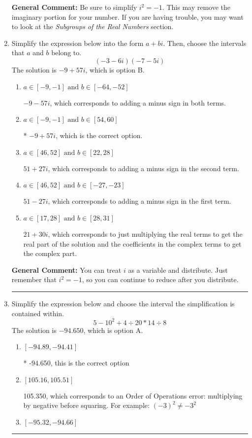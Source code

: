 \documentclass{extbook}[14pt]
\newcommand{\litem}[1]{\item #1

\rule{\textwidth}{0.4pt}}
\begin{document}
\begin{enumerate}
{\textbf{General Comment:} Be sure to simplify $i^2 = -1$. This may remove the imaginary portion for your number. If you are having trouble, you may want to look at the \textit{Subgroups of the Real Numbers} section.
}
\litem{
Simplify the expression below into the form $a+bi$. Then, choose the intervals that $a$ and $b$ belong to.
\[ (-3 - 6 i)(-7 - 5 i) \]The solution is \( -9 + 57 i \), which is option B.\begin{enumerate}[label=\Alph*.]
\item \( a \in [-9, -1] \text{ and } b \in [-64, -52] \)

 $-9 - 57 i$, which corresponds to adding a minus sign in both terms.
\item \( a \in [-9, -1] \text{ and } b \in [54, 60] \)

* $-9 + 57 i$, which is the correct option.
\item \( a \in [46, 52] \text{ and } b \in [22, 28] \)

 $51 + 27 i$, which corresponds to adding a minus sign in the second term.
\item \( a \in [46, 52] \text{ and } b \in [-27, -23] \)

 $51 - 27 i$, which corresponds to adding a minus sign in the first term.
\item \( a \in [17, 28] \text{ and } b \in [28, 31] \)

 $21 + 30 i$, which corresponds to just multiplying the real terms to get the real part of the solution and the coefficients in the complex terms to get the complex part.
\end{enumerate}

\textbf{General Comment:} You can treat $i$ as a variable and distribute. Just remember that $i^2=-1$, so you can continue to reduce after you distribute.
}
\litem{
Simplify the expression below and choose the interval the simplification is contained within.
\[ 5 - 10^2 + 4 \div 20 * 14 \div 8 \]The solution is \( -94.650 \), which is option A.\begin{enumerate}[label=\Alph*.]
\item \( [-94.89, -94.41] \)

* -94.650, this is the correct option
\item \( [105.16, 105.51] \)

 105.350, which corresponds to an Order of Operations error: multiplying by negative before squaring. For example: $(-3)^2 \neq -3^2$
\item \( [-95.32, -94.66] \)


\end{enumerate}}
\end{enumerate}
\end{document}
